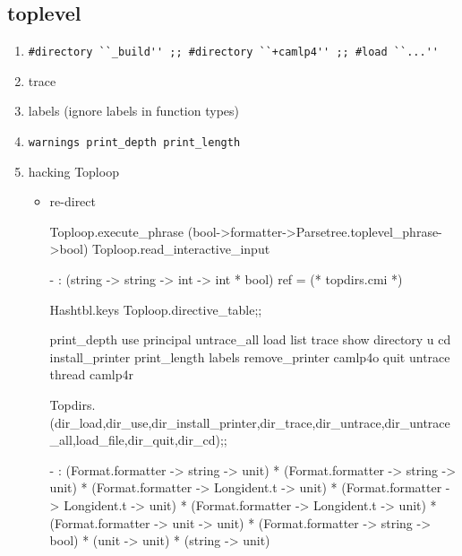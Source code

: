 

\subsection{toplevel}

\begin{enumerate}

\item \verb|#directory ``_build'' ;; #directory ``+camlp4'' ;; #load ``...''|
\item trace
\item labels (ignore labels in function types)
\item \verb|warnings print_depth print_length|
\item hacking Toploop
  \begin{itemize}
  \item re-direct 


\begin{redcode}
Toploop.execute_phrase (bool->formatter->Parsetree.toplevel_phrase->bool)
Toploop.read_interactive_input
\end{redcode}
\begin{bluecode}
- : (string -> string -> int -> int * bool) ref = (* topdirs.cmi *)
\end{bluecode}



\begin{redcode}
  Hashtbl.keys Toploop.directive_table;;
\end{redcode}

\begin{bluecode}
print_depth use principal untrace_all load list trace show directory u cd install_printer print_length labels remove_printer camlp4o quit untrace thread camlp4r  
\end{bluecode}


\begin{redcode}
Topdirs.(dir_load,dir_use,dir_install_printer,dir_trace,dir_untrace,dir_untrace_all,load_file,dir_quit,dir_cd);;  
\end{redcode}

\begin{bluecode}
- : (Format.formatter -> string -> unit) *
    (Format.formatter -> string -> unit) *
    (Format.formatter -> Longident.t -> unit) *
    (Format.formatter -> Longident.t -> unit) *
    (Format.formatter -> Longident.t -> unit) *
    (Format.formatter -> unit -> unit) *
    (Format.formatter -> string -> bool) * (unit -> unit) * (string -> unit)
\end{bluecode}





\end{itemize}
\end{enumerate}
